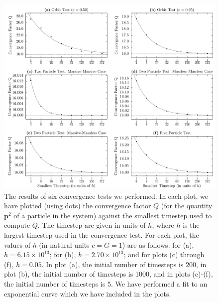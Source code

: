 \documentclass[aps,onecolumn,notitlepage,eqsecnum,nofootinbib,floatfix,superscriptaddress]{revtex4-1}
\begin{document}
\begin{figure}
 \includegraphics[width=\linewidth]{convergence_tests.pdf}
\caption{The results of six convergence tests we performed. In each plot, we have plotted (using dots) the convergence factor $Q$ (for the quantity $\textbf{p}^2$ of a particle in the system) against the smallest timestep used to compute $Q$. The timestep are given in units of $h$, where $h$ is the largest timestep used in the convergence test. For each plot, the values of $h$ (in natural units $c=G=1$) are as follows: for (a), $h=6.15 \times 10^{13}$; for (b), $h=2.70 \times 10^{13}$; and for plots (c) through (f), $h=0.05$. In plot (a), the initial number of timesteps is $200$, in plot (b), the initial number of timesteps is 1000, and in plots (c)-(f), the initial number of timesteps is $5$. We have performed a fit to an exponential curve which we have included in the plots.}
\label{FIG-ConvergenceTests}
\end{figure}
\end{document}
